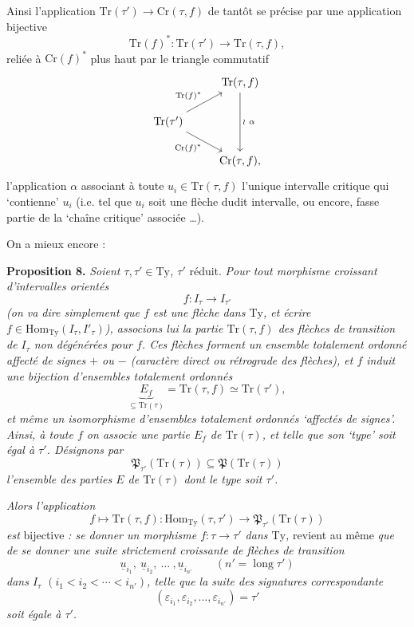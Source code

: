 \documentclass[11pt]{article}
\newcommand{\printedpage}[1]{\marginpar{\footnotesize p.~#1}}
\newcommand{\msp}[1]{\marginpar{\footnotesize [#1]}}
\newcommand{\Hom}{\mathrm{Hom}}
\newcommand{\Ty}{\mathrm{Ty}}
\newcommand{\Tr}{\mathrm{Tr}}
\newcommand{\Cr}{\mathrm{Cr}}
\newcommand{\lng}{\operatorname{long}}
\begin{document}
Ainsi l'application $\Tr(\tau') \longrightarrow \Cr(\tau, f)$ de tantôt se précise par une application bijective
\[
\Tr(f)^* : \Tr(\tau') \longrightarrow \Tr(\tau, f),
\]
reliée à $\Cr(f)^*$ plus haut par le triangle commutatif
\[
\begin{tikzcd}
 & \Tr(\tau, f) \arrow[dd, "\wr\ \alpha"] \\
\Tr(\tau') \arrow[ur, "\Tr(f)^*"] \arrow[dr, "\Cr(f)^*"'] & \\
 & \Cr(\tau, f),
\end{tikzcd}
\]
\printedpage{25}
\msp{page 39}
l'application $\alpha$ associant à toute $u_i \in \Tr(\tau, f)$ l'unique intervalle critique qui ‘contienne’ $u_i$ (i.e. tel que $u_i$ soit une flèche dudit intervalle, ou encore, fasse partie de la ‘chaîne critique’ associée \dots).

On a mieux encore :

\textbf{Proposition 8.} \textit{Soient $\tau, \tau' \in \mathrm{Ty}$, $\tau'$} réduit. \textit{Pour tout morphisme croissant d'intervalles orientés}
\[
f : I_\tau \longrightarrow I_{\tau'}
\]
\textit{(on va dire simplement que $f$ est une flèche dans $\Ty$, et écrire $f \in \Hom_{\Ty}(I_\tau, I'_\tau)$), associons lui la partie $\Tr(\tau, f)$ des flèches de transition de $I_\tau$ non dégénérées pour $f$. Ces flèches forment un ensemble totalement ordonné affecté de signes $+$ ou $-$ (caractère direct ou rétrograde des flèches), et $f$ induit une bijection d'ensembles totalement ordonnés} %
\[
\underbrace{E_f}_{\subseteq \Tr(\tau)} = \Tr(\tau, f) \simeq \Tr(\tau'),
\]
\textit{et même un isomorphisme d'ensembles totalement ordonnés ‘affectés de signes’. Ainsi, à toute $f$ on associe une partie $E_f$ de $\Tr(\tau)$, et telle que son ‘type’ soit égal à $\tau'$. Désignons par}
\[
\mathfrak{P}_{\tau'}(\Tr(\tau)) \subseteq \mathfrak{P}(\Tr(\tau))
\]
\textit{l'ensemble des parties $E$ de $\Tr(\tau)$ dont le type soit $\tau'$.}

\msp{page 40}
\textit{Alors l'application}
\[
f \longmapsto \Tr(\tau, f) : \Hom_{\Ty}(\tau, \tau') \longrightarrow \mathfrak{P}_{\tau'}(\Tr(\tau))
\]
\textit{est} bijective \textit{: se donner un morphisme $f : \tau \longrightarrow \tau'$ dans $\Ty$,} revient au même \textit{que de se donner une suite strictement croissante de flèches de transition}
\[
\underline{u}_{i_1},\ \underline{u}_{i_2},\ \dots\ ,\underline{u}_{i_{n'}} \qquad (n' = \lng \tau')
\]
\textit{dans $I_\tau$ $(i_1 < i_2 < \cdots < i_{n'})$, telle que la suite des signatures correspondante}
\[
(\varepsilon_{i_1}, \varepsilon_{i_2}, \dots, \varepsilon_{i_{n'}}) = \tau'
\]
\textit{soit égale à $\tau'$.}
\end{document}
